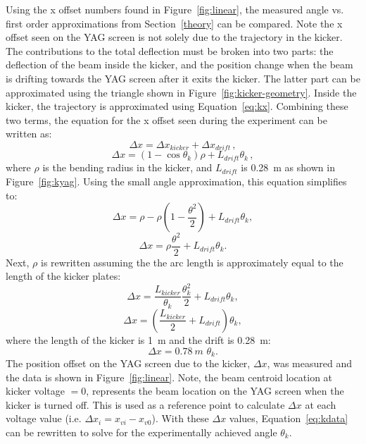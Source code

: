 \documentclass[aps,prab,preprint,groupedaddress,linenumbers]{revtex4-2}
\begin{document}
Using the x offset numbers found in Figure~\ref{fig:linear}, 
the measured angle vs. first order approximations from Section~\ref{theory} can be compared. 
Note the x offset seen on the YAG screen is not solely due to the trajectory in the kicker.
The contributions to the total deflection must be broken into two parts: the deflection of the beam inside the kicker, 
and the position change when the beam is drifting towards the YAG screen after it exits the kicker.
The latter part can be approximated using the triangle shown in Figure~\ref{fig:kicker-geometry}.
Inside the kicker, the trajectory is approximated using Equation~\ref{eq:kx}. 
Combining these two terms, the equation for the x offset seen during the experiment
can be written as:
\begin{equation}
\Delta x = \Delta x_{kicker} + \Delta x_{drift}\, ,
\end{equation}
\begin{equation}
\Delta x = \left(1-\cos\theta_{k}\right)\rho + L_{drift} \theta_{k}\, ,
\label{eq:kdata}
\end{equation}
where $\rho$ is the bending radius in the kicker, and $L_{drift}$ is \SI{0.28}{m} as shown in Figure~\ref{fig:kyag}.
Using the small angle approximation, this equation simplifies to:
\begin{equation}
\Delta x = \rho - \rho \left(1-\frac{\theta^2}{2}\right) + L_{drift} \theta_{k},
\end{equation}
\begin{equation}
\Delta x = \rho \frac{\theta^2}{2} + L_{drift} \theta_{k}.
\end{equation}
Next, $\rho$ is rewritten assuming the the arc length is approximately equal 
to the length of the kicker plates:
\begin{equation}
\Delta x = \frac{L_{kicker}}{\theta_{k}}\frac{\theta_{k}^2}{2} + L_{drift}\theta_{k},
\end{equation}
\begin{equation}
\Delta x = \left(\frac{L_{kicker}}{2}+ L_{drift}\right)\theta_{k},
\end{equation}
where the length of the kicker is \SI{1}{m} and the drift is \SI{0.28}{m}:
\begin{equation}
\Delta x = \SI{0.78}{m}\,\,\theta_{k}.
\label{eq:kdx}
\end{equation}
The position offset on the YAG screen due to the kicker, $\Delta x$, 
was measured and the data is shown in Figure~\ref{fig:linear}. 
Note, the beam centroid location at kicker voltage $=0$, 
represents the beam location on the YAG screen when the kicker is turned off.
This is used as a reference point to calculate $\Delta x$ at each voltage value
(i.e. $\Delta x_i = x_{vi} - x_{v0}$).
With these $\Delta x$ values, Equation~\ref{eq:kdata} can be rewritten to 
solve for the experimentally achieved angle $\theta_{k}$.
\end{document}
